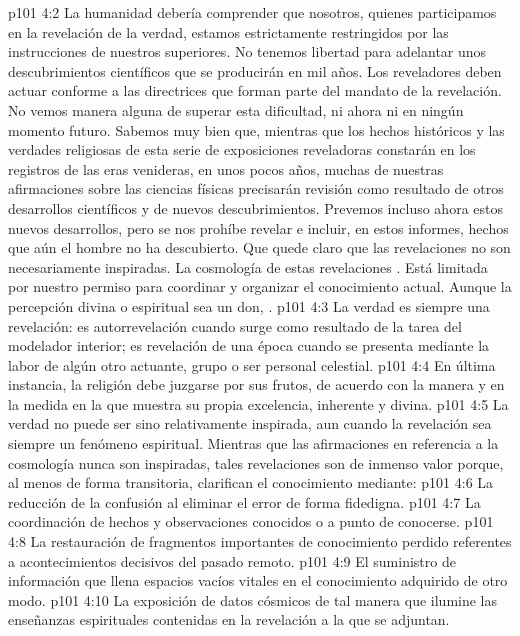 \vs p101 4:2 La humanidad debería comprender que nosotros, quienes participamos en la revelación de la verdad, estamos estrictamente restringidos por las instrucciones de nuestros superiores. No tenemos libertad para adelantar unos descubrimientos científicos que se producirán en mil años. Los reveladores deben actuar conforme a las directrices que forman parte del mandato de la revelación. No vemos manera alguna de superar esta dificultad, ni ahora ni en ningún momento futuro. Sabemos muy bien que, mientras que los hechos históricos y las verdades religiosas de esta serie de exposiciones reveladoras constarán en los registros de las eras venideras, en unos pocos años, muchas de nuestras afirmaciones sobre las ciencias físicas precisarán revisión como resultado de otros desarrollos científicos y de nuevos descubrimientos. Prevemos incluso ahora estos nuevos desarrollos, pero se nos prohíbe revelar e incluir, en estos informes, hechos que aún el hombre no ha descubierto. Que quede claro que las revelaciones no son necesariamente inspiradas. La cosmología de estas revelaciones . Está limitada por nuestro permiso para coordinar y organizar el conocimiento actual. Aunque la percepción divina o espiritual sea un don, .
\vs p101 4:3 \pc La verdad es siempre una revelación: es autorrevelación cuando surge como resultado de la tarea del modelador interior; es revelación de una época cuando se presenta mediante la labor de algún otro actuante, grupo o ser personal celestial.
\vs p101 4:4 En última instancia, la religión debe juzgarse por sus frutos, de acuerdo con la manera y en la medida en la que muestra su propia excelencia, inherente y divina.
\vs p101 4:5 \pc La verdad no puede ser sino relativamente inspirada, aun cuando la revelación sea siempre un fenómeno espiritual. Mientras que las afirmaciones en referencia a la cosmología nunca son inspiradas, tales revelaciones son de inmenso valor porque, al menos de forma transitoria, clarifican el conocimiento mediante:
\vs p101 4:6 La reducción de la confusión al eliminar el error de forma fidedigna.
\vs p101 4:7 La coordinación de hechos y observaciones conocidos o a punto de conocerse.
\vs p101 4:8 La restauración de fragmentos importantes de conocimiento perdido referentes a acontecimientos decisivos del pasado remoto.
\vs p101 4:9 El suministro de información que llena espacios vacíos vitales en el conocimiento adquirido de otro modo.
\vs p101 4:10 La exposición de datos cósmicos de tal manera que ilumine las enseñanzas espirituales contenidas en la revelación a la que se adjuntan.
